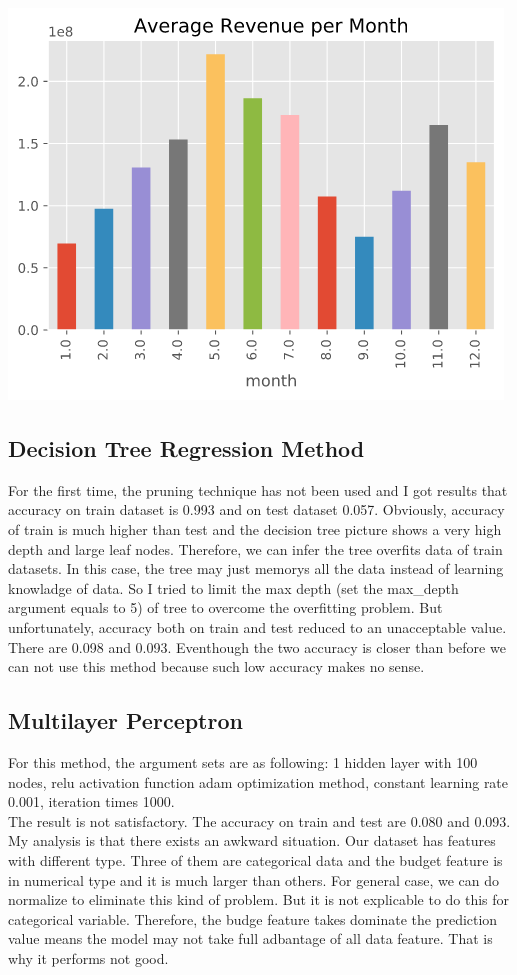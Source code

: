 \documentclass[UTF8]{article}
\begin{document}
\begin{itemize}
\begin{itemize}
\begin{center}
                        \includegraphics[scale=0.5]{Img/date.png}
                    \end{center}
          \end{itemize}
\end{itemize}


\subsection{Decision Tree Regression Method}
For the first time, the pruning technique has not been used and I got results that
accuracy on train dataset is 0.993 and on test dataset 0.057. Obviously, accuracy of train is
much higher than test and the decision tree picture shows a very high depth and large leaf nodes.
Therefore, we can infer the tree overfits data of train datasets. In this case,
the tree may just memorys all the data instead of learning knowladge of data.
So I tried to limit the max depth (set the max\_depth argument equals to 5) of tree
to overcome the overfitting problem. But unfortunately, accuracy both on train and test
reduced to an unacceptable value. There are 0.098 and 0.093. Eventhough the two accuracy is closer than
before we can not use this method because such low accuracy makes no sense.
\subsection{Multilayer Perceptron}
For this method, the argument sets are as following: 1 hidden layer with 100 nodes, relu activation function
adam optimization method, constant learning rate 0.001, iteration times 1000.\\
The result is not satisfactory. The accuracy on train and test are 0.080 and 0.093.
My analysis is that there exists an awkward situation. Our dataset has features with different type.
Three of them are categorical data and the budget feature is in numerical type and it is much larger than
others. For general case, we can do normalize to eliminate this kind of problem.
But it is not explicable to do this for categorical variable. Therefore, the budge feature
takes dominate the prediction value means the model may not take full adbantage of all data feature.
That is why it performs not good.
\end{document}
